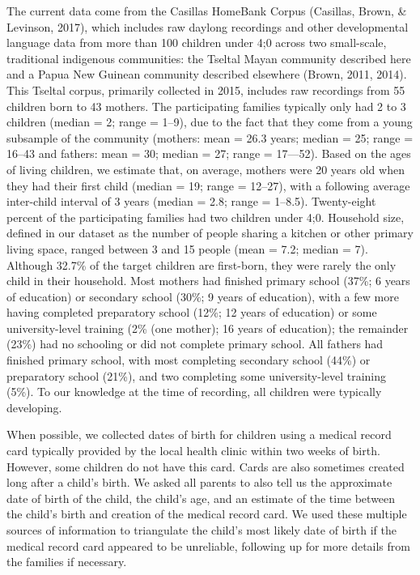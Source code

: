 \documentclass[,man,floatsintext]{apa6}
\begin{document}
The current data come from the Casillas HomeBank Corpus (Casillas,
Brown, \& Levinson, 2017), which includes raw daylong recordings and
other developmental language data from more than 100 children under 4;0
across two small-scale, traditional indigenous communities: the Tseltal
Mayan community described here and a Papua New Guinean community
described elsewhere (Brown, 2011, 2014). This Tseltal corpus, primarily
collected in 2015, includes raw recordings from 55 children born to 43
mothers. The participating families typically only had 2 to 3 children
(median = 2; range = 1--9), due to the fact that they come from a young
subsample of the community (mothers: mean = 26.3 years; median = 25;
range = 16--43 and fathers: mean = 30; median = 27; range = 17---52).
Based on the ages of living children, we estimate that, on average,
mothers were 20 years old when they had their first child (median = 19;
range = 12--27), with a following average inter-child interval of 3
years (median = 2.8; range = 1--8.5). Twenty-eight percent of the
participating families had two children under 4;0. Household size,
defined in our dataset as the number of people sharing a kitchen or
other primary living space, ranged between 3 and 15 people (mean = 7.2;
median = 7). Although 32.7\% of the target children are first-born, they
were rarely the only child in their household. Most mothers had finished
primary school (37\%; 6 years of education) or secondary school (30\%; 9
years of education), with a few more having completed preparatory school
(12\%; 12 years of education) or some university-level training (2\%
(one mother); 16 years of education); the remainder (23\%) had no
schooling or did not complete primary school. All fathers had finished
primary school, with most completing secondary school (44\%) or
preparatory school (21\%), and two completing some university-level
training (5\%). To our knowledge at the time of recording, all children
were typically developing.

When possible, we collected dates of birth for children using a medical
record card typically provided by the local health clinic within two
weeks of birth. However, some children do not have this card. Cards are
also sometimes created long after a child's birth. We asked all parents
to also tell us the approximate date of birth of the child, the child's
age, and an estimate of the time between the child's birth and creation
of the medical record card. We used these multiple sources of
information to triangulate the child's most likely date of birth if the
medical record card appeared to be unreliable, following up for more
details from the families if necessary.
\end{document}
